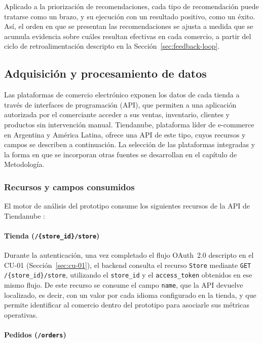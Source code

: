 Aplicado a la priorización de recomendaciones, cada tipo de recomendación puede tratarse como un brazo, y su ejecución con un resultado positivo, como un éxito. Así, el orden en que se presentan las recomendaciones se ajusta a medida que se acumula evidencia sobre cuáles resultan efectivas en cada comercio, a partir del ciclo de retroalimentación descripto en la Sección~\ref{sec:feedback-loop}.

\subsection{Adquisición y procesamiento de datos}
\label{sec:adquisicion-datos}

Las plataformas de comercio electrónico exponen los datos de cada tienda a través de interfaces de programación (API), que permiten a una aplicación autorizada por el comerciante acceder a sus ventas, inventario, clientes y productos sin intervención manual. Tiendanube, plataforma líder de e-commerce en Argentina y América Latina, ofrece una API de este tipo, cuyos recursos y campos se describen a continuación. La selección de las plataformas integradas y la forma en que se incorporan otras fuentes se desarrollan en el capítulo de Metodología.

\subsubsection{Recursos y campos consumidos}
\label{sec:recursos-campos}

El motor de análisis del prototipo consume los siguientes recursos de la API de Tiendanube \parencite{TiendanubeAPI2024}:

\paragraph{Tienda (\texttt{/\{store\_id\}/store})}

Durante la autenticación, una vez completado el flujo OAuth~2.0 descripto en el CU-01 (Sección~\ref{sec:cu-01}), el backend consulta el recurso \texttt{Store} mediante \texttt{GET /\{store\_id\}/store}, utilizando el \texttt{store\_id} y el \texttt{access\_token} obtenidos en ese mismo flujo. De este recurso se consume el campo \texttt{name}, que la API devuelve localizado, es decir, con un valor por cada idioma configurado en la tienda, y que permite identificar al comercio dentro del prototipo para asociarle sus métricas operativas.

\paragraph{Pedidos (\texttt{/orders})}

